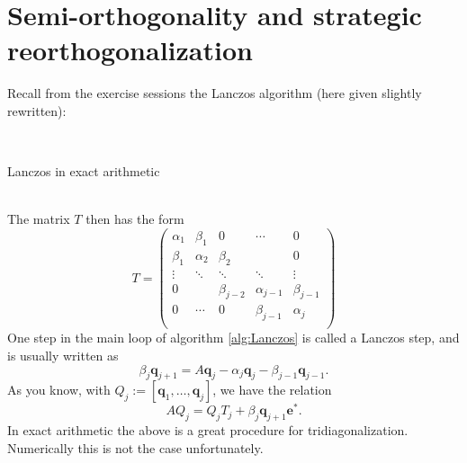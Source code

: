 \documentclass[12pt]{article}
\begin{document}
\section{Semi-orthogonality and strategic reorthogonalization}
Recall from the exercise sessions the Lanczos algorithm (here given slightly rewritten):
\begin{algorithm2e}[ht]\label{alg:Lanczos}
\SetAlgoLined
{}
\\
 \caption{Lanczos in exact arithmetic}
\end{algorithm2e}\\
The matrix $T$ then has the form 
$$T=\begin{pmatrix}
\alpha_1&\beta_1&0&\cdots&0\\
\beta_1&\alpha_2&\beta_2&&0\\
\vdots&\ddots&\ddots&\ddots&\vdots\\
0&&\beta_{j-2}&\alpha_{j-1}&\beta_{j-1}\\
0&\cdots&0&\beta_{j-1}&\alpha_{j}\\
\end{pmatrix}$$
 One step in the main loop of algorithm \ref{alg:Lanczos} is called a Lanczos step, and is usually written as
 \begin{equation}\label{eq:LanczosStep}
 \beta_j\mathbf{q}_{j+1}=A\mathbf{q}_j-\alpha_j\mathbf{q}_j-\beta_{j-1}\mathbf{q}_{j-1}.
 \end{equation}
 As you know, with $Q_{j}:=[\mathbf{q}_1,\ldots,\mathbf{q}_j]$, we have the relation
\begin{equation}\label{eq:matLanczos}
AQ_{j}=Q_jT_j+\beta_{j}\mathbf{q}_{j+1}\mathbf{e}^{\ast}.
\end{equation}
In exact arithmetic the above is a great procedure for tridiagonalization. Numerically this is
not the case unfortunately. 
\end{document}
